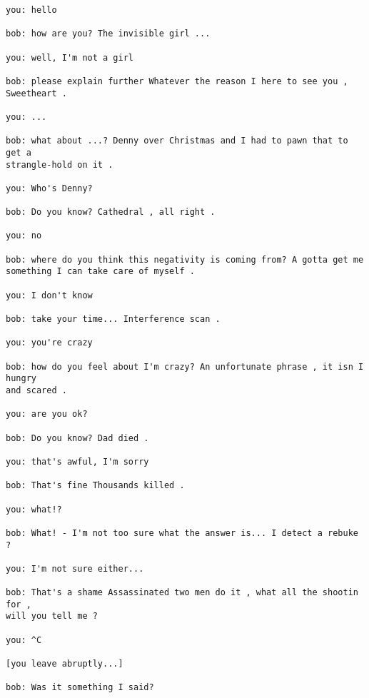 \documentclass[]{article}
\begin{document}
\begin{verbatim}
you: hello

bob: how are you? The invisible girl ...

you: well, I'm not a girl

bob: please explain further Whatever the reason I here to see you , Sweetheart .

you: ...

bob: what about ...? Denny over Christmas and I had to pawn that to get a 
strangle-hold on it .

you: Who's Denny?

bob: Do you know? Cathedral , all right .

you: no

bob: where do you think this negativity is coming from? A gotta get me 
something I can take care of myself .

you: I don't know

bob: take your time... Interference scan .

you: you're crazy

bob: how do you feel about I'm crazy? An unfortunate phrase , it isn I hungry 
and scared .

you: are you ok?

bob: Do you know? Dad died .

you: that's awful, I'm sorry

bob: That's fine Thousands killed .

you: what!?

bob: What! - I'm not too sure what the answer is... I detect a rebuke ?

you: I'm not sure either...

bob: That's a shame Assassinated two men do it , what all the shootin for , 
will you tell me ?

you: ^C

[you leave abruptly...]

bob: Was it something I said?
\end{verbatim}
\end{document}
